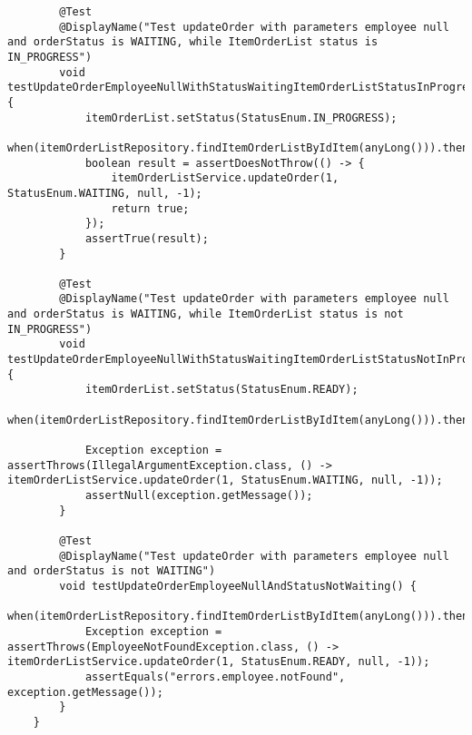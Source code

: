 \begin{verbatim}
		@Test
		@DisplayName("Test updateOrder with parameters employee null and orderStatus is WAITING, while ItemOrderList status is IN_PROGRESS")
		void testUpdateOrderEmployeeNullWithStatusWaitingItemOrderListStatusInProgress() {
			itemOrderList.setStatus(StatusEnum.IN_PROGRESS);
			when(itemOrderListRepository.findItemOrderListByIdItem(anyLong())).thenReturn(itemOrderList);
			boolean result = assertDoesNotThrow(() -> {
				itemOrderListService.updateOrder(1, StatusEnum.WAITING, null, -1);
				return true;
			});
			assertTrue(result);
		}

		@Test
		@DisplayName("Test updateOrder with parameters employee null and orderStatus is WAITING, while ItemOrderList status is not IN_PROGRESS")
		void testUpdateOrderEmployeeNullWithStatusWaitingItemOrderListStatusNotInProgress() {
			itemOrderList.setStatus(StatusEnum.READY);
			when(itemOrderListRepository.findItemOrderListByIdItem(anyLong())).thenReturn(itemOrderList);

			Exception exception = assertThrows(IllegalArgumentException.class, () -> itemOrderListService.updateOrder(1, StatusEnum.WAITING, null, -1));
			assertNull(exception.getMessage());
		}

		@Test
		@DisplayName("Test updateOrder with parameters employee null and orderStatus is not WAITING")
		void testUpdateOrderEmployeeNullAndStatusNotWaiting() {
			when(itemOrderListRepository.findItemOrderListByIdItem(anyLong())).thenReturn(itemOrderList);
			Exception exception = assertThrows(EmployeeNotFoundException.class, () -> itemOrderListService.updateOrder(1, StatusEnum.READY, null, -1));
			assertEquals("errors.employee.notFound", exception.getMessage());
		}
	}
\end{verbatim}


